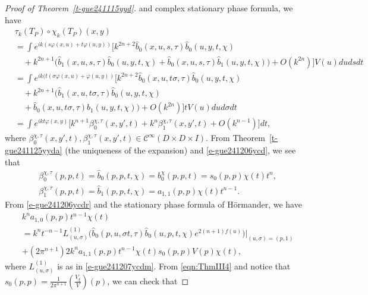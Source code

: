 \documentclass[12pt]{amsart}
\theoremstyle{definition}
\theoremstyle{named}
\numberwithin{equation}{subsection}
\def\cC{\mathscr{C}}
\begin{document}
\begin{proof}[Proof of Theorem~\ref{t-gue241115yyd}]
and complex stationary phase formula, we have 
\begin{equation}
    \begin{split}
       &\tau_k(T_P)\circ\chi_k(T_P)(x,y)\\
       &=\int e^{ik(s\varphi(x,u)+t\varphi(u,y))}\Bigg[k^{2n+2}\hat b_0(x,u,s,\tau)\hat b_0(u,y,t,\chi)\\
       &\quad+k^{2n+1}\Big(\hat b_1(x,u,s,\tau)\hat b_0(u,y,t,\chi)+\hat b_0(x,u,s,\tau)\hat b_1(u,y,t,\chi)\Big)+O(k^{2n})\Bigg] V(u)dudsdt\\ 
       &=\int e^{ik(t(\sigma\varphi(x,u)+\varphi(u,y))}\Bigg[k^{2n+2}\hat b_0(x,u,t\sigma,\tau)\hat b_0(u,y,t,\chi)\\
&\quad+k^{2n+1}\Big(\hat b_1(x,u,t\sigma,\tau)\hat b_0(u,y,t,\chi)\\
&\quad+\hat b_0(x,u,t\sigma,\tau)\hat b_1(u,y,t,\chi)\Big)+O(k^{2n})\Bigg] tV(u)dud\sigma dt\\
       &=\int e^{ikt\varphi(x,y)}\Bigg[k^{n+1}\beta^{\chi,\tau}_0(x,y',t)+k^n\beta^{\chi,\tau}_1(x,y',t)+O(k^{n-1})\Bigg]dt,
    \end{split}
    \end{equation}
    where $\beta^{\chi,\tau}_0(x,y',t), \beta^{\chi,\tau}_1(x,y',t)\in\cC^\infty(D\times D\times I)$. From Theorem~\ref{t-gue241125yyda} (the uniqueness of the expansion) and \eqref{e-gue241206ycd}, we see that
    \begin{equation}\label{e-gue241206ycdr}
    \begin{split}
    &\beta^{\chi,\tau}_0(p,p,t)=\hat b_0(p,p,t,\chi)=b^\chi_0(p,p,t)=s_0(p,p)\chi(t)t^n,\\
    &\beta^{\chi,\tau}_1(p,p,t)=\hat b_1(p,p,t,\chi)=a_{1,1}(p,p)\chi(t)t^{n-1}.
    \end{split}
    \end{equation}
From \eqref{e-gue241206ycdr} and the stationary phase formula of H\"ormander, we have  
\[\begin{split}
    &k^na_{1,0}(p,p)t^{n-1}\chi(t)\\
    &= k^nt^{-n-1}L^{(1)}_{(u,\sigma)}\Big(\hat b_0(p,u,\sigma t,\tau)\hat b_0(u,p,t,\chi)e^{2(n+1)f(u)}\Big)|_{(u,\sigma)=(p,1)}\\
    &+(2\pi^{n+1})2k^na_{1,1}(p,p)t^{n-1}\chi(t)s_0(p,p)V(p)\chi(t),
\end{split}\]
where $L^{(1)}_{(u,\sigma)}$ is as in \eqref{e-gue241207ycdm}. 
From \eqref{eqn:ThmIII4} and notice that $s_0(p,p)=\frac{1}{2\pi^{n+1}}\left(\frac{V_{\xi}}{V}\right)(p)$, we can check that 

\end{proof}
\end{document}
